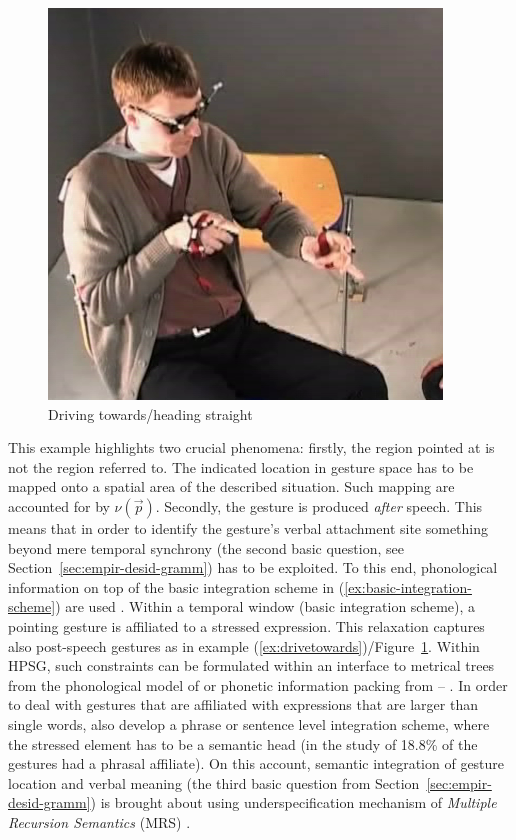 \documentclass[output=paper]{langsci/langscibook}
\begin{document}
\begin{figure}[tb]
  \centering
  \includegraphics[width=0.5\linewidth]{figures/draufzu}
  \caption{Driving towards/heading straight}
  \label{fig:drivetowards}
\end{figure}

This example highlights two crucial phenomena: firstly, the region pointed at is not the region referred to. 
%
The indicated location in gesture space has to be mapped onto a spatial area of the described situation.
%
Such mapping are accounted for by $\nu(\vec{p})$.
%
Secondly, the gesture is produced \emph{after} speech. 
%
This means that in order to identify the gesture's verbal attachment site something beyond mere temporal synchrony (the second basic question, see Section~\ref{sec:empir-desid-gramm}) has to be exploited.
%
To this end, phonological information on top  of the basic integration scheme in (\ref{ex:basic-integration-scheme}) are used \citep{Alahverdzhieva:Lascarides:2011,Luecking:2013:a}.
%
Within a temporal window (basic integration scheme), a pointing gesture is affiliated to a stressed expression. 
%
This relaxation captures also post-speech gestures  as in example (\ref{ex:drivetowards})/Figure~\ref{fig:drivetowards}.
%
Within HPSG, such constraints can be formulated within an interface to metrical trees from the phonological model of \citet{Klein:2000} or phonetic information packing from \citet{Engdahl:Vallduvi:1996} -- . 
%
In order to deal with gestures that are affiliated with expressions that are larger than single words, \citet{Alahverdzhieva:Lascarides:2011} also develop a phrase or sentence level integration scheme, where the stressed element has to be a semantic head (in the study of \citet{Mehler:Luecking:2012:d} 18.8\% of the gestures had a phrasal affiliate).
%
On this account, semantic integration of gesture location and verbal meaning (the third basic question from Section~\ref{sec:empir-desid-gramm}) is brought about using underspecification mechanism of \textit{Multiple Recursion Semantics} (MRS) \citep{Copestake:Flickinger:Pollard:Sag:2005}.
\end{document}
